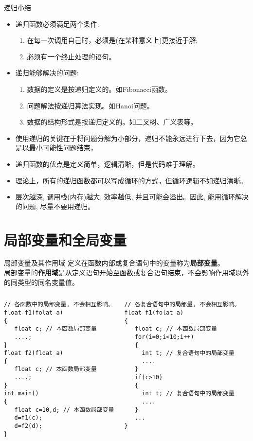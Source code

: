 \begin{frame}{递归小结}
\begin{itemize}
	\item 递归函数必须满足两个条件:
	\begin{enumerate}
		\item 在每一次调用自己时，必须是(在某种意义上)更接近于解;
		\item 必须有一个终止处理的语句。
	\end{enumerate}
    \item 递归能够解决的问题:
    \begin{enumerate}
    	\item 数据的定义是按递归定义的。如Fibonacci函数。
    	\item 问题解法按递归算法实现。如Hanoi问题。
    	\item 数据的结构形式是按递归定义的。如二叉树、广义表等。
    \end{enumerate}
	\item 使用递归的关键在于将问题分解为小部分，递归不能永远进行下去，因为它总是以最小可能性问题结束，
	\item 递归函数的优点是定义简单，逻辑清晰，但是代码难于理解。
	\item 理论上，所有的递归函数都可以写成循环的方式，但循环逻辑不如递归清晰。
	\item 层次越深, 调用栈(内存)越大, 效率越低, 并且可能会溢出。因此, 能用循环解决的问题, 尽量不要用递归。
\end{itemize}
\end{frame}

\section{局部变量和全局变量}

\begin{frame}{局部变量及其作用域}
定义在函数内部或复合语句中的变量称为\textbf{局部变量}。\\
局部变量的\textbf{作用域}是从定义语句开始至函数或复合语句结束，不会影响作用域以外的同类型的同名变量值。 
\begin{columns}[T]
\begin{lstlisting}
// 各函数中的局部变量, 不会相互影响。
float f1(folat a) 
{
   float c; // 本函数局部变量
   ....;
}
float f2(float a)
{ 
   float c; // 本函数局部变量
   ....;
}
int main()
{
   float c=10,d; // 本函数局部变量
   d=f1(c);
   d=f2(d);
}
\end{lstlisting}
\begin{lstlisting}
// 各复合语句中的局部量, 不会相互影响。
float f1(folat a) 
{
   float c; // 本函数局部变量
   for(i=0;i<10;i++) 
   {
     int t; // 复合语句中的局部变量 
     ....
   }
   if(c>10)
   {
     int t; // 复合语句中的局部变量 
     ....
   }
   ...
}
\end{lstlisting}
\end{columns}
~\\
\end{frame}

